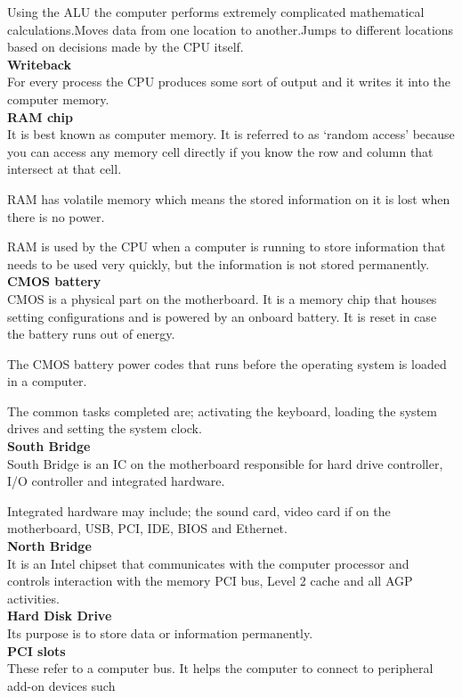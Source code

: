 \documentclass{article}
\begin{document}
 Using the ALU the computer performs extremely complicated mathematical calculations.Moves data from one location to another.Jumps to different locations based on decisions made by the CPU itself.\\
\textbf{Writeback}\\
For every process the CPU produces some sort of output and it writes it into the computer memory.\\
\textbf{RAM chip}\\
It is best known as computer memory. It is referred to as ‘random access’ because you can access any memory cell directly if you know the row and column that intersect at that cell.
\par RAM has volatile memory which means the stored information on it is lost when there is no power.
\par RAM is used by the CPU when a computer is running to store information that needs to be used very quickly, but the information is not stored permanently.\\
\textbf{CMOS battery}\\
CMOS is a physical part on the motherboard. It is a memory chip that houses setting configurations and is powered by an onboard battery. It is reset in case the battery runs out of energy.
\par The CMOS battery power codes that runs before the operating system is loaded in a computer.
\par The common tasks completed are; activating the keyboard, loading the system drives and setting the system clock.\\
\textbf{South Bridge}\\
South Bridge is an IC on the motherboard responsible for hard drive controller, I/O controller and integrated hardware.
\par Integrated hardware may include; the sound card, video card if on the motherboard, USB, PCI, IDE, BIOS and Ethernet.\\
\textbf{North Bridge}\\
It is an Intel chipset that communicates with the computer processor and controls interaction with the memory PCI bus, Level 2 cache and all AGP activities.\\
\textbf{Hard Disk Drive}\\
Its purpose is to store data or information permanently.\\
\textbf{PCI slots}\\
These refer to a computer bus. It helps the computer to connect to peripheral add-on devices such
\end{document}
